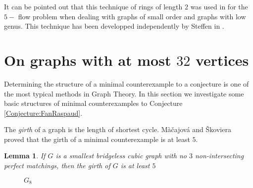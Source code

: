 \documentclass{elsart}
\theoremstyle{plain} \theoremheaderfont{\scshape}
\newtheorem{Lem}[Thm]{\bf Lemma}
\begin{document}
It can be pointed out that this technique of rings of length $2$ was
used in \cite{Fou85} for the $5-$ flow problem when dealing with
graphs of small order and graphs with low genus. This technique has
been developped independently  by Steffen in \cite{Ste96}.



\section{On graphs with at most $32$ vertices}

Determining the structure of a minimal counterexample to a
conjecture is one of the most typical methods in Graph Theory. In
this section we investigate some basic structures of minimal
counterexamples to Conjecture \ref{Conjecture:FanRaspaud}.

The {\em girth} of a graph is the length of shortest cycle.
M\`{a}\v{c}ajov\'{a} and  \v{S}koviera \cite{MacSko} proved that the
girth of a minimal counterexample is at least $5$.
\begin{Lem}\cite{MacSko} \label{Lemma:Girth5}  If $G$ is a smallest bridgeless
cubic graph with no $3$ non-intersecting perfect matchings, then the
girth of $G$ is at least $5$
\end{Lem}


\begin{figure}[t]
\begin{center}
\centering{} \hsize{} \caption{$G_8$}
 \label{Figure:G8}
\end{center}
\end{figure}
\end{document}
